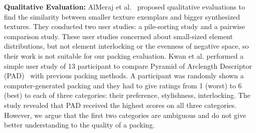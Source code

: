 


\newtext
{
\textbf{Qualitative Evaluation:}
AlMeraj et al.~\cite{AlMerajEval2013} proposed qualitative evaluations to find
the similarity between smaller texture exemplars and bigger synthesized textures.
They conducted two user studies: a pile-sorting study and a pairwise comparison study.
These user studies concerned about small-sized element distributions, but not element interlocking or the evenness of negative space, 
so their work is not suitable for our packing evaluation.
Kwan et al. performed a simple user study of 13 participant to compare 
Pyramid of Arclength Descriptor (PAD)~\cite{Kwan2016} with previous packing methods.
A participant was randomly shown a computer-generated packing and they had to give ratings from 1 (worst) to 6 (best)
to each of three categories: their preference, stylishness, interlocking.
The study revealed that PAD received the highest scores on all three categories.
However, we argue that the first two categories are ambiguous and do not give better understanding to the quality of a packing.
}

